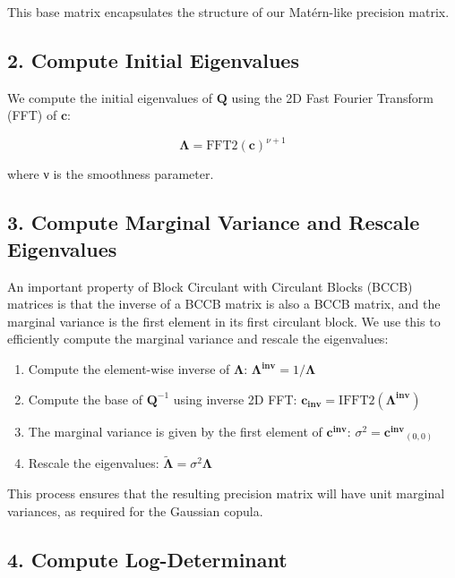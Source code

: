 \documentclass[
  12pt]{article}
\providecommand{\tightlist}{%
  \setlength{\itemsep}{0pt}\setlength{\parskip}{0pt}}\usepackage{longtable,booktabs,array}
\begin{document}
This base matrix encapsulates the structure of our Matérn-like precision
matrix.

\subsection{2. Compute Initial
Eigenvalues}\label{compute-initial-eigenvalues}

We compute the initial eigenvalues of \(\mathbf Q\) using the 2D Fast
Fourier Transform (FFT) of \(\mathbf c\):

\[
\boldsymbol{\Lambda} = \text{FFT2}(\mathbf{c})^{\nu+1}
\]

where ν is the smoothness parameter.

\subsection{3. Compute Marginal Variance and Rescale
Eigenvalues}\label{compute-marginal-variance-and-rescale-eigenvalues}

An important property of Block Circulant with Circulant Blocks (BCCB)
matrices is that the inverse of a BCCB matrix is also a BCCB matrix, and
the marginal variance is the first element in its first circulant block.
We use this to efficiently compute the marginal variance and rescale the
eigenvalues:

\begin{enumerate}
\def\labelenumi{\alph{enumi}.}
\tightlist
\item
  Compute the element-wise inverse of \(\boldsymbol{\Lambda}\):
  \(\mathbf{\Lambda^{inv}} = 1 / \boldsymbol{\Lambda}\)
\item
  Compute the base of \(\mathbf Q^{-1}\) using inverse 2D FFT:
  \(\mathbf{c_{inv}} = \text{IFFT2}(\mathbf{{\Lambda^{inv}}})\)
\item
  The marginal variance is given by the first element of
  \(\mathbf{c^{inv}}\): \(\sigma^2 = \mathbf{c^{inv}}_{(0,0)}\)
\item
  Rescale the eigenvalues:
  \(\boldsymbol{\widetilde \Lambda} = \sigma^2 \boldsymbol{\Lambda}\)
\end{enumerate}

This process ensures that the resulting precision matrix will have unit
marginal variances, as required for the Gaussian copula.

\subsection{4. Compute Log-Determinant}\label{compute-log-determinant}
\end{document}
